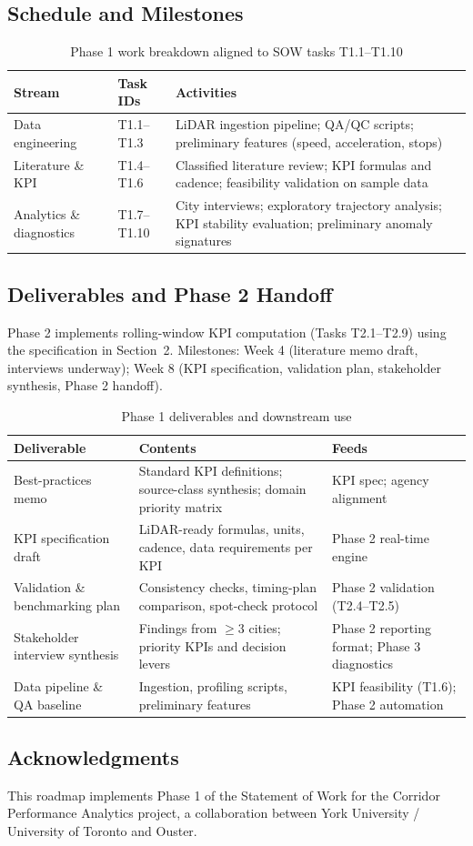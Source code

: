 \documentclass[11pt]{article}
\begin{document}
\subsection*{Schedule and Milestones}
\begin{table}[htbp]
\centering
\caption{Phase 1 work breakdown aligned to SOW tasks T1.1--T1.10}
\label{tab:workbreakdown}
\small
\begin{tabularx}{\textwidth}{@{}p{}p{}X@{}}
\toprule
Stream & Task IDs & Activities \\
\midrule
Data engineering & T1.1--T1.3 & LiDAR ingestion pipeline; QA/QC scripts; preliminary features (speed, acceleration, stops) \\
Literature \& KPI & T1.4--T1.6 & Classified literature review; KPI formulas and cadence; feasibility validation on sample data \\
Analytics \& diagnostics & T1.7--T1.10 & City interviews; exploratory trajectory analysis; KPI stability evaluation; preliminary anomaly signatures \\
\bottomrule
\end{tabularx}
\end{table}

\subsection*{Deliverables and Phase 2 Handoff}

Phase 2 implements rolling-window KPI computation (Tasks T2.1--T2.9) using the specification in Section~2. Milestones: Week 4 (literature memo draft, interviews underway); Week 8 (KPI specification, validation plan, stakeholder synthesis, Phase 2 handoff).

\begin{table}[htbp]
\centering
\caption{Phase 1 deliverables and downstream use}
\label{tab:deliverables}
\small
\begin{tabularx}{\textwidth}{@{}p{}X p{}@{}}
\toprule
Deliverable & Contents & Feeds \\
\midrule
Best-practices memo & Standard KPI definitions; source-class synthesis; domain priority matrix & KPI spec; agency alignment \\
KPI specification draft & LiDAR-ready formulas, units, cadence, data requirements per KPI & Phase 2 real-time engine \\
Validation \& benchmarking plan & Consistency checks, timing-plan comparison, spot-check protocol & Phase 2 validation (T2.4--T2.5) \\
Stakeholder interview synthesis & Findings from $\geq3$ cities; priority KPIs and decision levers & Phase 2 reporting format; Phase 3 diagnostics \\
Data pipeline \& QA baseline & Ingestion, profiling scripts, preliminary features & KPI feasibility (T1.6); Phase 2 automation \\
\bottomrule
\end{tabularx}
\end{table}

\subsection*{Acknowledgments}

This roadmap implements Phase 1 of the Statement of Work for the Corridor Performance Analytics project, a collaboration between York University / University of Toronto and Ouster.



\end{document}
